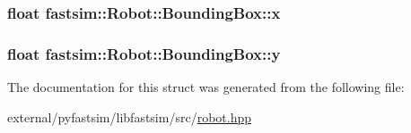 \subsubsection[{\texorpdfstring{x}{x}}]{\setlength{\rightskip}{0pt plus 5cm}float fastsim\+::\+Robot\+::\+Bounding\+Box\+::x}\hypertarget{structfastsim_1_1_robot_1_1_bounding_box_a4732ef54907878a2b1d95cd25e52803f}{}\label{structfastsim_1_1_robot_1_1_bounding_box_a4732ef54907878a2b1d95cd25e52803f}
\subsubsection[{\texorpdfstring{y}{y}}]{\setlength{\rightskip}{0pt plus 5cm}float fastsim\+::\+Robot\+::\+Bounding\+Box\+::y}\hypertarget{structfastsim_1_1_robot_1_1_bounding_box_a9d249ac1802353d28129006ce6689613}{}\label{structfastsim_1_1_robot_1_1_bounding_box_a9d249ac1802353d28129006ce6689613}


The documentation for this struct was generated from the following file\+:\begin{DoxyCompactItemize}
\item 
external/pyfastsim/libfastsim/src/\hyperlink{robot_8hpp}{robot.\+hpp}\end{DoxyCompactItemize}
